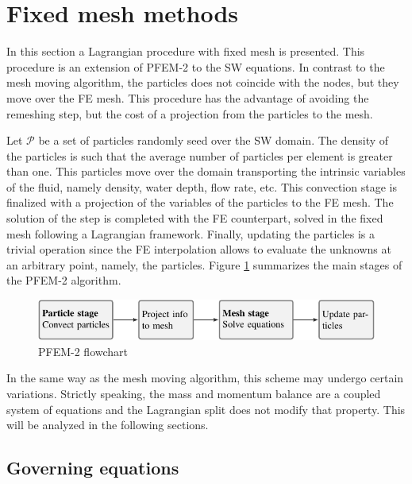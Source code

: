 \section{Fixed mesh methods}


In this section a Lagrangian procedure with fixed mesh is presented. This procedure is an extension of PFEM-2 \cite{idelsohn2012} to the SW equations. In contrast to the mesh moving algorithm, the particles does not coincide with the nodes, but they move over the FE mesh. This procedure has the advantage of avoiding the remeshing step, but the cost of a projection from the particles to the mesh.

Let $\mathcal{P}$ be a set of particles randomly seed over the SW domain. The density of the particles is such that the average number of particles per element is greater than one. This particles move over the domain transporting the intrinsic variables of the fluid, namely density, water depth, flow rate, etc. This convection stage is finalized with a projection of the variables of the particles to the FE mesh.
The solution of the step is completed with the FE counterpart, solved in the fixed mesh following a Lagrangian framework. Finally, updating the particles is a trivial operation since the FE interpolation allows to evaluate the unknowns at an arbitrary point, namely, the particles.
Figure \ref{pfem2_stage_flowchart} summarizes the main stages of the PFEM-2 algorithm.


\begin{figure}
    \centering
    \includegraphics[width=\textwidth]{img/lagrangian/pfem2_stage_flowchart.pdf}
    \caption{PFEM-2 flowchart}
    \label{pfem2_stage_flowchart}
\end{figure}


In the same way as the mesh moving algorithm, this scheme may undergo certain variations. Strictly speaking, the mass and momentum balance are a coupled system of equations and the Lagrangian split does not modify that property. This will be analyzed in the following sections.



\subsection{Governing equations}


